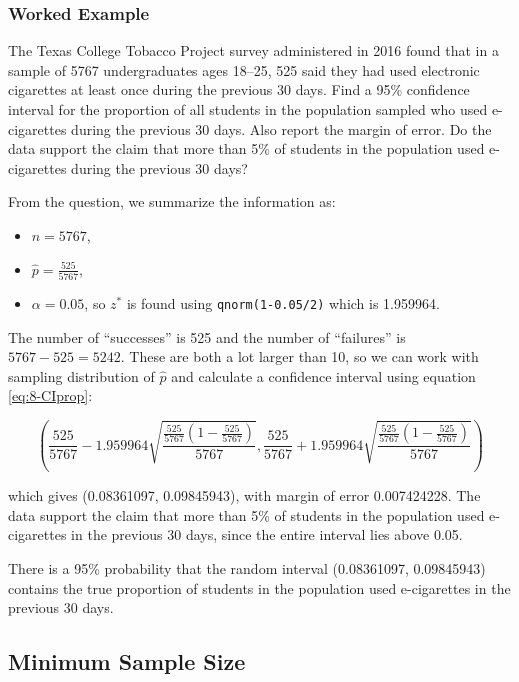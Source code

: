 \documentclass[
]{book}
\providecommand{\tightlist}{%
  \setlength{\itemsep}{0pt}\setlength{\parskip}{0pt}}
\begin{document}
\hypertarget{worked-example-3}{%
\subsubsection{Worked Example}\label{worked-example-3}}

The Texas College Tobacco Project survey administered in 2016 found that in a sample of 5767 undergraduates ages 18--25, 525 said they had used electronic cigarettes at least once during the previous 30 days. Find a 95\% confidence interval for the proportion of all students in the population sampled who used e-cigarettes during the previous 30 days. Also report the margin of error. Do the data support the claim that more than 5\% of students in the population used e-cigarettes during the previous 30 days?

From the question, we summarize the information as:

\begin{itemize}
\tightlist
\item
  \(n = 5767\),
\item
  \(\hat{p} = \frac{525}{5767}\),
\item
  \(\alpha = 0.05\), so \(z^*\) is found using \texttt{qnorm(1-0.05/2)} which is 1.959964.
\end{itemize}

The number of ``successes'' is 525 and the number of ``failures'' is \(5767-525 = 5242\). These are both a lot larger than 10, so we can work with sampling distribution of \(\hat{p}\) and calculate a confidence interval using equation \eqref{eq:8-CIprop}:

\[
\left( \frac{525}{5767} - 1.959964 \sqrt{\frac{\frac{525}{5767}(1-\frac{525}{5767})}{5767}} , \frac{525}{5767} + 1.959964 \sqrt{\frac{\frac{525}{5767}(1-\frac{525}{5767})}{5767}} \right)
\]

which gives (0.08361097, 0.09845943), with margin of error 0.007424228. The data support the claim that more than 5\% of students in the population used e-cigarettes in the previous 30 days, since the entire interval lies above 0.05.

There is a 95\% probability that the random interval (0.08361097, 0.09845943) contains the true proportion of students in the population used e-cigarettes in the previous 30 days.

\hypertarget{minimum-sample-size}{%
\subsection{Minimum Sample Size}\label{minimum-sample-size}}
\end{document}
